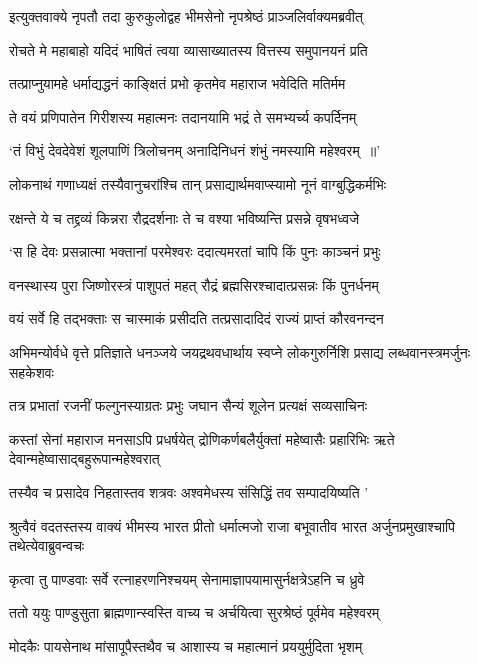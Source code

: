 \twolineshloka
{इत्युक्तवाक्ये नृपतौ तदा कुरुकुलोद्वह}
{भीमसेनो नृपश्रेष्ठं प्राञ्जलिर्वाक्यमब्रवीत्}


\twolineshloka
{रोचते मे महाबाहो यदिदं भाषितं त्वया}
{व्यासाख्यातस्य वित्तस्य समुपानयनं प्रति}


\twolineshloka
{तत्प्राप्नुयामहे धर्माद्यद्धनं काङ्क्षितं प्रभो}
{कृतमेव महाराज भवेदिति मतिर्मम}


\twolineshloka
{ते वयं प्रणिपातेन गिरीशस्य महात्मनः}
{तदानयामि भद्रं ते समभ्यर्च्य कपर्दिनम्}


\twolineshloka
{`तं विभुं देवदेवेशं शूलपाणिं त्रिलोचनम्}
{अनादिनिधनं शंभुं नमस्यामि महेश्वरम् ॥'}


\twolineshloka
{लोकनाथं गणाध्यक्षं तस्यैवानुचरांश्चि तान्}
{प्रसाद्यार्थमवाप्स्यामो नूनं वाग्बुद्धिकर्मभिः}


\twolineshloka
{रक्षन्ते ये च तद्द्रव्यं किन्नरा रौद्रदर्शनाः}
{ते च वश्या भविष्यन्ति प्रसन्ने वृषभध्वजे}


\twolineshloka
{`स हि देवः प्रसन्नात्मा भक्तानां परमेश्वरः}
{ददात्यमरतां चापि किं पुनः काञ्चनं प्रभुः}


\twolineshloka
{वनस्थास्य पुरा जिष्णोरस्त्रं पाशुपतं महत्}
{रौद्रं ब्रह्मसिरश्चादात्प्रसन्नः किं पुनर्धनम्}


\twolineshloka
{वयं सर्वे हि तद्भक्ताः स चास्माकं प्रसीदति}
{तत्प्रसादादिदं राज्यं प्राप्तं कौरवनन्दन}


\threelineshloka
{अभिमन्योर्वधे वृत्ते प्रतिज्ञाते धनञ्जये}
{जयद्रथवधार्थाय स्वप्ने लोकगुरुर्निशि}
{प्रसाद्य लब्धवानस्त्रमर्जुनः सहकेशवः}


\twolineshloka
{तत्र प्रभातां रजनीं फल्गुनस्याग्रतः प्रभुः}
{जघान सैन्यं शूलेन प्रत्यक्षं सव्यसाचिनः}


\threelineshloka
{कस्तां सेनां महाराज मनसाऽपि प्रधर्षयेत्}
{द्रोणिकर्णबलैर्युक्तां महेष्वासैः प्रहारिभिः}
{ऋते देवान्महेष्वासाद्बहुरूपान्महेश्वरात्}


\threelineshloka
{तस्यैव च प्रसादेव निहतास्तव शत्रवः}
{अश्वमेधस्य संसिद्धिं तव सम्पादयिष्यति}
{'}


\threelineshloka
{श्रुत्वैवं वदतस्तस्य वाक्यं भीमस्य भारत}
{प्रीतो धर्मात्मजो राजा बभूवातीव भारत}
{अर्जुनप्रमुखाश्चापि तथेत्येवाब्रुवन्वचः}


\twolineshloka
{कृत्वा तु पाण्डवाः सर्वे रत्नाहरणनिश्चयम्}
{सेनामाज्ञापयामासुर्नक्षत्रेऽहनि च ध्रुवे}


\twolineshloka
{ततो ययुः पाण्डुसुता ब्राह्मणान्स्वस्ति वाच्य च}
{अर्चयित्वा सुरश्रेष्ठं पूर्वमेव महेश्वरम्}


\twolineshloka
{मोदकैः पायसेनाथ मांसापूपैस्तथैव च}
{आशास्य च महात्मानं प्रययुर्मुदिता भृशम्}


